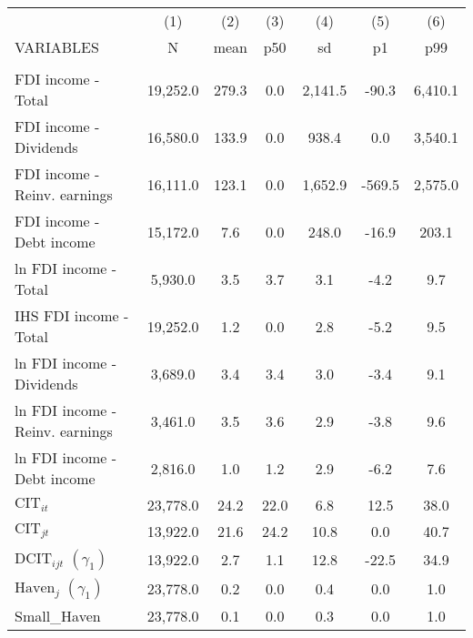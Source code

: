 \begin{center}
\begin{tabular}{lcccccc} \hline
 & (1) & (2) & (3) & (4) & (5) & (6) \\
VARIABLES & N & mean & p50 & sd & p1 & p99 \\ \hline
\vspace{4pt} & \begin{footnotesize}\end{footnotesize} & \begin{footnotesize}\end{footnotesize} & \begin{footnotesize}\end{footnotesize} & \begin{footnotesize}\end{footnotesize} & \begin{footnotesize}\end{footnotesize} & \begin{footnotesize}\end{footnotesize} \\
FDI income - Total & 19,252.0 & 279.3 & 0.0 & 2,141.5 & -90.3 & 6,410.1 \\
FDI income - Dividends & 16,580.0 & 133.9 & 0.0 & 938.4 & 0.0 & 3,540.1 \\
FDI income - Reinv. earnings & 16,111.0 & 123.1 & 0.0 & 1,652.9 & -569.5 & 2,575.0 \\
FDI income - Debt income & 15,172.0 & 7.6 & 0.0 & 248.0 & -16.9 & 203.1 \\
ln FDI income - Total & 5,930.0 & 3.5 & 3.7 & 3.1 & -4.2 & 9.7 \\
IHS FDI income - Total & 19,252.0 & 1.2 & 0.0 & 2.8 & -5.2 & 9.5 \\
ln FDI income - Dividends & 3,689.0 & 3.4 & 3.4 & 3.0 & -3.4 & 9.1 \\
ln FDI income - Reinv. earnings & 3,461.0 & 3.5 & 3.6 & 2.9 & -3.8 & 9.6 \\
ln FDI income - Debt income & 2,816.0 & 1.0 & 1.2 & 2.9 & -6.2 & 7.6 \\
$ \text{CIT}_{it}$ & 23,778.0 & 24.2 & 22.0 & 6.8 & 12.5 & 38.0 \\
$ \text{CIT}_{jt}$ & 13,922.0 & 21.6 & 24.2 & 10.8 & 0.0 & 40.7 \\
$ \text{DCIT}_{ijt}$ $(\gamma_1)$ & 13,922.0 & 2.7 & 1.1 & 12.8 & -22.5 & 34.9 \\
$\text{Haven}_j$ $(\gamma_1)$ & 23,778.0 & 0.2 & 0.0 & 0.4 & 0.0 & 1.0 \\
Small\_Haven & 23,778.0 & 0.1 & 0.0 & 0.3 & 0.0 & 1.0 \\

\end{tabular}
\end{center}
